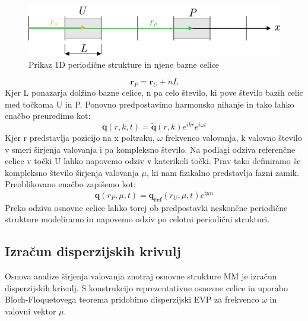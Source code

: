 \documentclass[12pt]{report}
\begin{document}
\begin{figure}[H]
  \centering
  \includegraphics{Images/bloch.png}
  \caption{Prikaz 1D periodične strukture in njene bazne celice}
\end{figure}
\begin{equation}
  \mathbf{r}_P = \mathbf{r}_U + nL
\end{equation}
Kjer L ponazarja dolžino bazne celice, n pa celo število, ki pove število bazih celic med točkama U in P. Ponovno predpostavimo harmonsko
nihanje in tako lahko enačbo preuredimo kot:
\begin{equation}
  \mathbf{q}(r, k, t)  = \widetilde{\mathbf{q}}(r, k)e^{ik r}e^{i\omega t}
\end{equation}
Kjer r predstavlja pozicijo na x poltraku, $\omega$ frekvenco valovanja, k valovno število v smeri širjenja valovanja i pa kompleksno število. Na podlagi odziva referenčne celice
v točki U lahko napovemo odziv v katerikoli točki. Prav tako definiramo še kompleksno število širjenja valovanja $\mu$, ki nam fizikalno predstavlja fazni zamik. Preoblikovano enačbo zapišemo
kot:
\begin{equation}
  \mathbf{q}(r_P, \mu, t)  = \mathbf{q_{ref}}(r_U, \mu,t)e^{i\mu n}
\end{equation} 
Preko odziva osnovne celice lahko torej ob predpostavki neskončne periodične strukture modeliramo in napovemo odziv po celotni
periodični strukturi.

\subsection{Izračun disperzijskih krivulj}
Osnova analize širjenja valovanja znotraj osnovne strukture \ac{MM} je izračun disperzijskih krivulj. S konstrukcijo reprezentativne
osnovne celice in uporabo Bloch-Floquetovega teorema pridobimo disperzijski \ac{EVP} za frekvenco $\omega$ in valovni vektor $\mu$. \cite{vanbelle}
\end{document}
